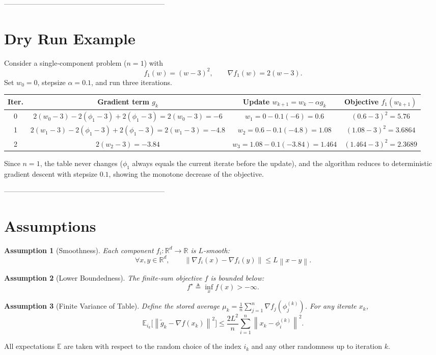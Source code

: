\documentclass{article}
\newtheorem{assumption}{Assumption}
\newcommand{\E}{\mathbb{E}}
\newcommand{\norm}[1]{\left\|#1\right\|}
\newcommand{\grad}{\nabla}
\begin{document}
--------------------------------------------------------------------

\section*{Dry Run Example}
Consider a single‑component problem ($n=1$) with
\[
f_1(w)=(w-3)^2 ,\qquad \grad f_1(w)=2(w-3).
\]
Set $w_0=0$, stepsize $\alpha=0.1$, and run three iterations.

\begin{center}
\begin{tabular}{c|c|c|c}
\textbf{Iter.}&\textbf{Gradient term $g_k$}&\textbf{Update $w_{k+1}=w_k-\alpha g_k$}&\textbf{Objective $f_1(w_{k+1})$}\\ \hline
0 & $2(w_0-3)-2(\phi_1-3)+2(\phi_1-3)=2(w_0-3)=-6$ & $w_1=0-0.1(-6)=0.6$ & $(0.6-3)^2=5.76$\\
1 & $2(w_1-3)-2(\phi_1-3)+2(\phi_1-3)=2(w_1-3)=-4.8$ & $w_2=0.6-0.1(-4.8)=1.08$ & $(1.08-3)^2=3.6864$\\
2 & $2(w_2-3)=-3.84$ & $w_3=1.08-0.1(-3.84)=1.464$ & $(1.464-3)^2=2.3689$
\end{tabular}
\end{center}
Since $n=1$, the table never changes ($\phi_1$ always equals the current iterate before the update), and the algorithm reduces to deterministic gradient descent with stepsize $0.1$, showing the monotone decrease of the objective.

--------------------------------------------------------------------

\section*{Assumptions}
\begin{assumption}[Smoothness]\label{ass:smooth}
Each component $f_i:\mathbb{R}^{d}\!\to\!\mathbb{R}$ is $L$‑smooth:
\[
\forall x,y\in\mathbb{R}^{d},\qquad
\norm{\grad f_i(x)-\grad f_i(y)}\le L\norm{x-y}.
\]
\end{assumption}
\begin{assumption}[Lower Boundedness]\label{ass:lb}
The finite‑sum objective $f$ is bounded below:
\[
f^{\star}\triangleq\inf_{x}f(x)>-\infty .
\]
\end{assumption}
\begin{assumption}[Finite Variance of Table]\label{ass:var}
Define the stored average $\mu_k=\frac1n\sum_{j=1}^{n}\grad f_j(\phi_j^{(k)})$.
For any iterate $x_k$,
\[
\E_{i_k}\!\bigl[\norm{\tilde g_k-\grad f(x_k)}^{2}\bigr]
\le \frac{2L^{2}}{n}\sum_{i=1}^{n}\norm{x_k-\phi_i^{(k)}}^{2}.
\tag{4}
\]
\end{assumption}
All expectations $\E$ are taken with respect to the random choice of the index $i_k$ and any other randomness up to iteration $k$.
\end{document}
